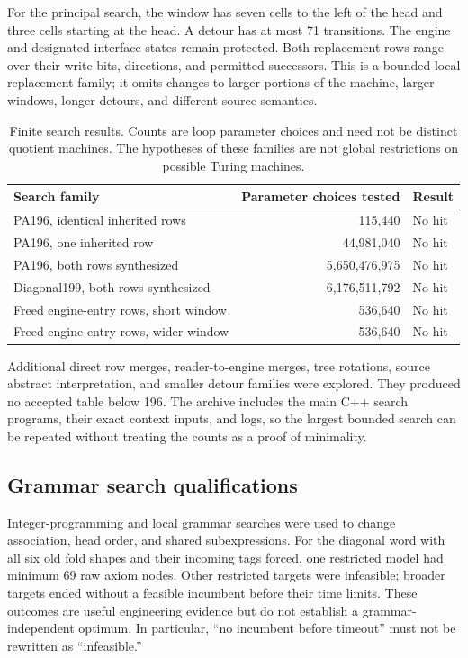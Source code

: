For the principal search, the window has seven cells to the left of the head and three cells starting at the head. A detour has at most 71 transitions. The engine and designated interface states remain protected. Both replacement rows range over their write bits, directions, and permitted successors. This is a bounded local replacement family; it omits changes to larger portions of the machine, larger windows, longer detours, and different source semantics.

\begin{table}[ht]
\centering\small
\begin{tabular}{@{}lrl@{}}
\toprule
Search family & Parameter choices tested & Result\\
\midrule
PA196, identical inherited rows &115,440&No hit\\
PA196, one inherited row &44,981,040&No hit\\
PA196, both rows synthesized &5,650,476,975&No hit\\
Diagonal199, both rows synthesized &6,176,511,792&No hit\\
Freed engine-entry rows, short window &536,640&No hit\\
Freed engine-entry rows, wider window &536,640&No hit\\
\bottomrule
\end{tabular}
\caption{Finite search results. Counts are loop parameter choices and need not be distinct quotient machines. The hypotheses of these families are not global restrictions on possible Turing machines.}
\end{table}

Additional direct row merges, reader-to-engine merges, tree rotations, source abstract interpretation, and smaller detour families were explored. They produced no accepted table below 196. The archive includes the main C++ search programs, their exact context inputs, and logs, so the largest bounded search can be repeated without treating the counts as a proof of minimality.

\subsection{Grammar search qualifications}
Integer-programming and local grammar searches were used to change association, head order, and shared subexpressions. For the diagonal word with all six old fold shapes and their incoming tags forced, one restricted model had minimum 69 raw axiom nodes. Other restricted targets were infeasible; broader targets ended without a feasible incumbent before their time limits. These outcomes are useful engineering evidence but do not establish a grammar-independent optimum. In particular, ``no incumbent before timeout'' must not be rewritten as ``infeasible.''

